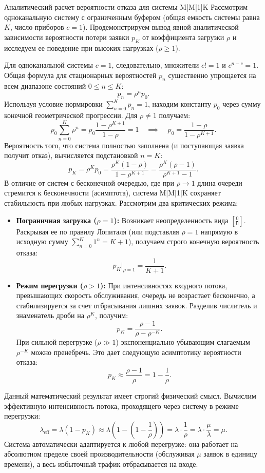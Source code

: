 \begin{example}{Аналитический расчет вероятности отказа для системы M|M|1|K}
Рассмотрим одноканальную систему с ограниченным буфером (общая емкость системы равна $K$, число приборов $c=1$). Продемонстрируем вывод явной аналитической зависимости вероятности потери заявки $p_K$ от коэффициента загрузки $\rho$ и исследуем ее поведение при высоких нагрузках ($\rho \ge 1$).
\end{example}

\begin{eproof}
Для одноканальной системы $c=1$, следовательно, множители $c! = 1$ и $c^{n-c} = 1$. Общая формула для стационарных вероятностей $p_n$ существенно упрощается на всем диапазоне состояний $0 \le n \le K$:
$$
p_n = \rho^n p_0.
$$
Используя условие нормировки $\sum_{n=0}^K p_n = 1$, находим константу $p_0$ через сумму конечной геометрической прогрессии. Для $\rho \ne 1$ получаем:
$$
p_0 \sum_{n=0}^K \rho^n = p_0 \frac{1 - \rho^{K+1}}{1 - \rho} = 1 \quad \implies \quad p_0 = \frac{1 - \rho}{1 - \rho^{K+1}}.
$$
Вероятность того, что система полностью заполнена (и поступающая заявка получит отказ), вычисляется подстановкой $n = K$:
$$
p_K = \rho^K p_0 = \frac{\rho^K (1 - \rho)}{1 - \rho^{K+1}} = \frac{\rho^K (\rho - 1)}{\rho^{K+1} - 1}.
$$
В отличие от систем с бесконечной очередью, где при $\rho \to 1$ длина очереди стремится к бесконечности (асимптота), система M|M|1|K сохраняет стабильность при любых нагрузках. Рассмотрим два критических режима:

\begin{itemize}
    \item \textbf{Пограничная загрузка ($\rho = 1$):} Возникает неопределенность вида $\left[ \frac{0}{0} \right]$. Раскрывая ее по правилу Лопиталя (или подставляя $\rho=1$ напрямую в исходную сумму $\sum_{n=0}^K 1^n = K+1$), получаем строго конечную вероятность отказа:
    $$
    p_K \Big|_{\rho=1} = \frac{1}{K+1}.
    $$
    
    \item \textbf{Режим перегрузки ($\rho > 1$):} При интенсивностях входного потока, превышающих скорость обслуживания, очередь не возрастает бесконечно, а стабилизируется за счет отбрасывания лишних заявок. Разделив числитель и знаменатель дроби на $\rho^K$, получим:
    $$
    p_K = \frac{\rho - 1}{\rho - \rho^{-K}}.
    $$
    При сильной перегрузке ($\rho \gg 1$) экспоненциально убывающим слагаемым $\rho^{-K}$ можно пренебречь. Это дает следующую асимптотику вероятности отказа:
    $$
    p_K \approx \frac{\rho - 1}{\rho} = 1 - \frac{1}{\rho}.
    $$
\end{itemize}

Данный математический результат имеет строгий физический смысл. Вычислим эффективную интенсивность потока, проходящего через систему в режиме перегрузки:
$$
\lambda_{\text{eff}} = \lambda (1 - p_K) \approx \lambda \left( 1 - \left( 1 - \frac{1}{\rho} \right) \right) = \lambda \cdot \frac{1}{\rho} = \lambda \cdot \frac{\mu}{\lambda} = \mu.
$$
Система автоматически адаптируется к любой перегрузке: она работает на абсолютном пределе своей производительности (обслуживая $\mu$ заявок в единицу времени), а весь избыточный трафик отбрасывается на входе.
\end{eproof}

